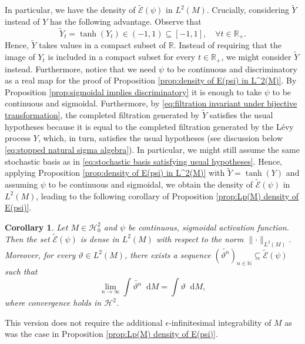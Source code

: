 \documentclass[11pt,a4paper,twoside,openany]{report}
\numberwithin{equation}{section}
\newcommand{\diff}{\mathop{}\!\mathrm{d}}
\theoremstyle{plain} %
\newtheorem{corollary}[theorem]{Corollary}
\theoremstyle{definition} %
\theoremstyle{remark} %
\begin{document}
In particular, we have the density of \(\widetilde{\mathcal{E}}(\psi)\) in \(L^2(M)\). Crucially, considering \(\widetilde{Y}\) instead of \(Y\) has the following advantage. Observe that
\begin{equation*}
\widetilde{Y}_t=\tanh(Y_t)\in(-1,1)\subseteq[-1,1],\quad\forall t\in\mathbb{R}_+.
\end{equation*}
Hence, \(\widetilde{Y}\) takes values in a compact subset of \(\mathbb{R}\). Instead of requiring that the image of \(Y_t\) is included in a compact subset for every \(t\in\mathbb{R}_+\), we might consider \(\widetilde{Y}\) instead.
Furthermore, notice that we need \(\psi\) to be continuous and discriminatory as a real map for the proof of Proposition \ref{prop:density of E(psi) in L^2(M)}. By Proposition \ref{prop:sigmoidal implies discriminatory} it is enough to take \(\psi\) to be continuous and sigmoidal. 
Furthermore, by \eqref{eq:filtration invariant under bijective transformation}, the completed filtration generated by \(\widetilde{Y}\) satisfies the usual hypotheses because it is equal to the completed filtration generated by the Lévy process \(Y\), which, in turn, satisfies the usual hypotheses (see discussion below \ref{eq:stopped natural sigma algebra}). In particular, we might still assume the same stochastic basis as in \eqref{eq:stochastic basis satisfying usual hypotheses}.
Hence, applying Proposition \ref{prop:density of E(psi) in L^2(M)} with \(\widetilde{Y}=\tanh(Y)\) and assuming \(\psi\) to be continuous and sigmoidal, we obtain the density of \(\widetilde{\mathcal{E}}(\psi)\) in \(L^2(M)\), leading to the following corollary of Proposition \ref{prop:Lp(M) density of E(psi)}.
\begin{corollary}\label{cor:Lp(M) density of tilde(E)(psi) for change of variables}
    Let \(M\in\mathcal{H}_0^{2}\) and \(\psi\) be continuous, sigmoidal activation function. Then the set \(\widetilde{\mathcal{E}}(\psi)\) is dense in \(L^2(M)\) with respect to the norm \(\lVert\cdot\rVert_{L^2(M)}\). Moreover, for every \(\vartheta\in L^2(M)\), there exists a sequence \((\widetilde{\vartheta^n})_{n\in\mathbb{N}}\subseteq\widetilde{\mathcal{E}}(\psi)\) such that
    \begin{equation*}
        \lim_{n\to\infty}\int \widetilde{\vartheta^n}\diff M=\int \vartheta\diff M,
    \end{equation*}
    where convergence holds in \(\mathcal{H}^2\). 
\end{corollary}
This version does not require the additional \(\epsilon\)-infinitesimal integrability of \(M\) as was the case in Proposition \ref{prop:Lp(M) density of E(psi)}.  
\end{document}
